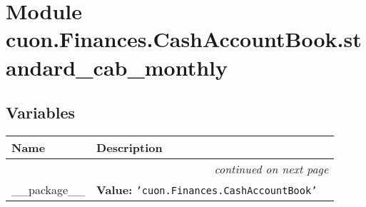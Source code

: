 %
%
%


\section{Module cuon.Finances.CashAccountBook.standard\_cab\_monthly}

    \label{cuon:Finances:CashAccountBook:standard_cab_monthly}


  \subsection{Variables}

    \vspace{-1cm}
\hspace{\varindent}\begin{longtable}{|p{\varnamewidth}|p{\vardescrwidth}|l}
\cline{1-2}
\cline{1-2} \centering \textbf{Name} & \centering \textbf{Description}& \\
\cline{1-2}
\endhead\cline{1-2}\multicolumn{3}{r}{\small\textit{continued on next page}}\\\endfoot\cline{1-2}
\endlastfoot\raggedright \_\-\_\-p\-a\-c\-k\-a\-g\-e\-\_\-\_\- & \raggedright \textbf{Value:} 
{\tt \texttt{'}\texttt{cuon.Finances.CashAccountBook}\texttt{'}}&\\
\cline{1-2}
\end{longtable}




